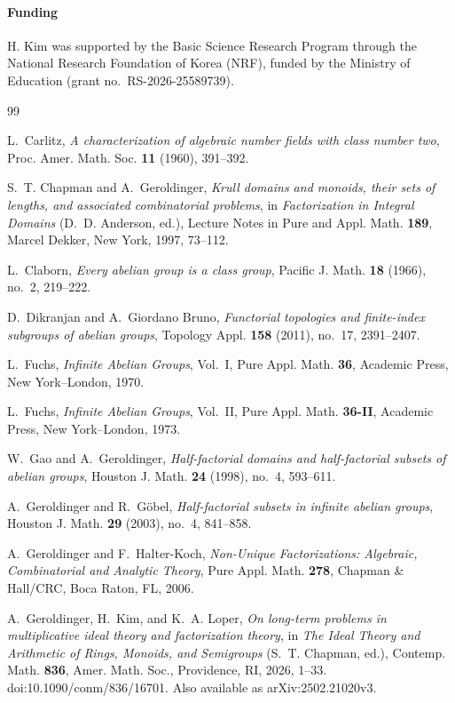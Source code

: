 \documentclass[11pt,reqno]{amsart}
\numberwithin{equation}{section}
\theoremstyle{definition}
\theoremstyle{remark}
\begin{document}
\paragraph{\bf Funding}
H. Kim was supported by the Basic Science Research Program through
the National Research Foundation of Korea (NRF), funded by the Ministry
of Education (grant no.~RS-2026-25589739).

\begin{thebibliography}{99}

L.~Carlitz,
\emph{A characterization of algebraic number fields with class number two},
Proc. Amer. Math. Soc. \textbf{11} (1960), 391--392.

S.~T. Chapman and A.~Geroldinger,
\emph{Krull domains and monoids, their sets of lengths, and associated
combinatorial problems}, in \emph{Factorization in Integral Domains}
(D.~D. Anderson, ed.), Lecture Notes in Pure and Appl. Math.
\textbf{189}, Marcel Dekker, New York, 1997, 73--112.

L.~Claborn,
\emph{Every abelian group is a class group},
Pacific J. Math. \textbf{18} (1966), no.~2, 219--222.

D.~Dikranjan and A.~Giordano Bruno,
\emph{Functorial topologies and finite-index subgroups of abelian groups},
Topology Appl. \textbf{158} (2011), no.~17, 2391--2407.

L.~Fuchs,
\emph{Infinite Abelian Groups}, Vol.~I,
Pure Appl. Math. \textbf{36}, Academic Press, New York--London, 1970.

L.~Fuchs,
\emph{Infinite Abelian Groups}, Vol.~II,
Pure Appl. Math. \textbf{36-II}, Academic Press, New York--London, 1973.

W.~Gao and A.~Geroldinger,
\emph{Half-factorial domains and half-factorial subsets of abelian groups},
Houston J. Math. \textbf{24} (1998), no.~4, 593--611.

A.~Geroldinger and R.~G\"obel,
\emph{Half-factorial subsets in infinite abelian groups},
Houston J. Math. \textbf{29} (2003), no.~4, 841--858.

A.~Geroldinger and F.~Halter-Koch,
\emph{Non-Unique Factorizations: Algebraic, Combinatorial and Analytic
Theory}, Pure Appl. Math. \textbf{278}, Chapman \& Hall/CRC,
Boca Raton, FL, 2006.

A.~Geroldinger, H.~Kim, and K.~A. Loper,
\emph{On long-term problems in multiplicative ideal theory and
factorization theory}, in \emph{The Ideal Theory and Arithmetic of
Rings, Monoids, and Semigroups} (S.~T. Chapman, ed.),
Contemp. Math. \textbf{836}, Amer. Math. Soc., Providence, RI,
2026, 1--33. doi:10.1090/conm/836/16701.
Also available as arXiv:2502.21020v3.


\end{thebibliography}
\end{document}
